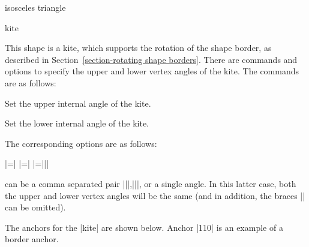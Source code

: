 \begin{shape}{isosceles triangle}
\end{shape}


\par\leavevmode
\begin{shape}{kite}

	This shape is a kite, which supports the rotation of the shape border, 
	as described in Section~\ref{section-rotating shape borders}. 
	There are \pgfname{} commands and \tikzname{} 
	options to specify the upper and lower	vertex angles of the kite. 
	The \pgfname{} commands are as follows:
	
	\begin{command}{\pgfsetkiteuppervertexangle{}}
	Set the upper internal angle of the kite.
	\end{command}
	
	\begin{command}{\pgfsetkitelowervertexangle{}}
	Set the lower internal angle of the kite.
	\end{command}
	
	The corresponding \tikzname{} options are as follows:
	
	\begin{itemize}
    |=|
    |=|
    |={||}|
    
     can be a comma separated pair 
    |{||,||}|, or a single angle.
    In this latter case, both the upper and lower vertex angles will 
    be the same (and in addition, the braces |{}| can be omitted).
    
\begin{codeexample}[]
\end{codeexample}

 \end{itemize}

	The anchors for the |kite| are shown below. Anchor |110| is an 
	example of a border anchor.
	

\end{shape}

